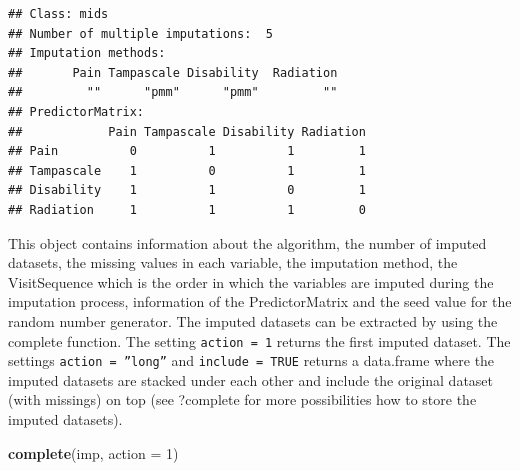 \documentclass[]{book}
\newenvironment{Shaded}{\begin{snugshade}}{\end{snugshade}}
\newcommand{\KeywordTok}[1]{\textcolor[rgb]{0.13,0.29,0.53}{\textbf{#1}}}
\newcommand{\DataTypeTok}[1]{\textcolor[rgb]{0.13,0.29,0.53}{#1}}
\newcommand{\DecValTok}[1]{\textcolor[rgb]{0.00,0.00,0.81}{#1}}
\newcommand{\NormalTok}[1]{#1}
\begin{document}
\begin{verbatim}
## Class: mids
## Number of multiple imputations:  5 
## Imputation methods:
##       Pain Tampascale Disability  Radiation 
##         ""      "pmm"      "pmm"         "" 
## PredictorMatrix:
##            Pain Tampascale Disability Radiation
## Pain          0          1          1         1
## Tampascale    1          0          1         1
## Disability    1          1          0         1
## Radiation     1          1          1         0
\end{verbatim}

This object contains information about the algorithm, the number of
imputed datasets, the missing values in each variable, the imputation
method, the VisitSequence which is the order in which the variables are
imputed during the imputation process, information of the
PredictorMatrix and the seed value for the random number generator. The
imputed datasets can be extracted by using the complete function. The
setting \texttt{action\ =\ 1} returns the first imputed dataset. The
settings \texttt{action\ =\ ”long”} and \texttt{include\ =\ TRUE}
returns a data.frame where the imputed datasets are stacked under each
other and include the original dataset (with missings) on top (see
?complete for more possibilities how to store the imputed datasets).

\begin{Shaded}
\begin{Highlighting}[]
\KeywordTok{complete}\NormalTok{(imp, }\DataTypeTok{action =} \DecValTok{1}\NormalTok{)}
\end{Highlighting}
\end{Shaded}
\end{document}

